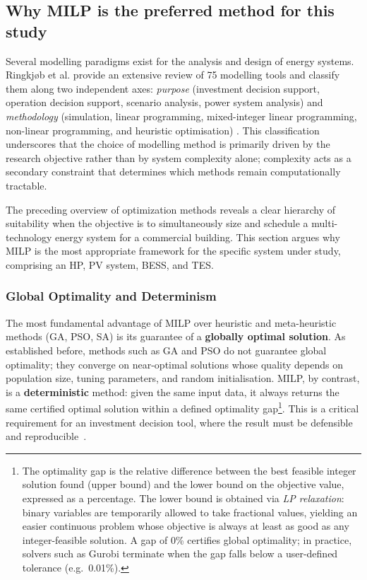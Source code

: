 \documentclass[11pt,a4paper]{report}
\begin{document}
\subsection{Why MILP is the preferred method for this study}

Several modelling paradigms exist for the analysis and design of energy systems. Ringkj{\o}b et al.
provide an extensive review of 75 modelling tools and classify 
them along two independent axes: \textit{purpose} (investment decision support, 
operation decision support, scenario analysis, power system analysis) and 
\textit{methodology} (simulation, linear programming, mixed-integer linear 
programming, non-linear programming, and heuristic optimisation) \cite{Ringkjob2018}. This 
classification underscores that the choice of modelling method is primarily 
driven by the research objective rather than by system complexity alone; complexity 
acts as a secondary constraint that determines which methods remain computationally 
tractable.


The preceding overview of optimization methods reveals a clear hierarchy of suitability when the objective is to simultaneously size and schedule a multi-technology energy system for a commercial building. This section argues why MILP is the most appropriate framework for the specific system under study, comprising an HP, PV system, BESS, and TES.

\subsubsection*{Global Optimality and Determinism}

The most fundamental advantage of MILP over heuristic and meta-heuristic methods (GA, PSO, SA) is its guarantee of a \textbf{globally optimal solution}. As established before, methods such as GA and PSO do not guarantee global optimality; they converge on near-optimal solutions whose quality depends on population size, tuning parameters, and random initialisation. MILP, by contrast, is a \textbf{deterministic} method: given the same input data, it always returns the same certified optimal solution within a defined optimality gap\footnote{The optimality gap is the relative difference between the best feasible integer solution found (upper bound) and the lower bound on the objective value, expressed as a percentage. The lower bound is obtained via \textit{LP relaxation}: binary variables are temporarily allowed to take fractional values, yielding an easier continuous problem whose objective is always at least as good as any integer-feasible solution. A gap of 0\% certifies global optimality; in practice, solvers such as Gurobi terminate when the gap falls below a user-defined tolerance (e.g.\ 0.01\%).}. This is a critical requirement for an investment decision tool, where the result must be defensible and reproducible~\cite{beck2021milp}.
\end{document}
